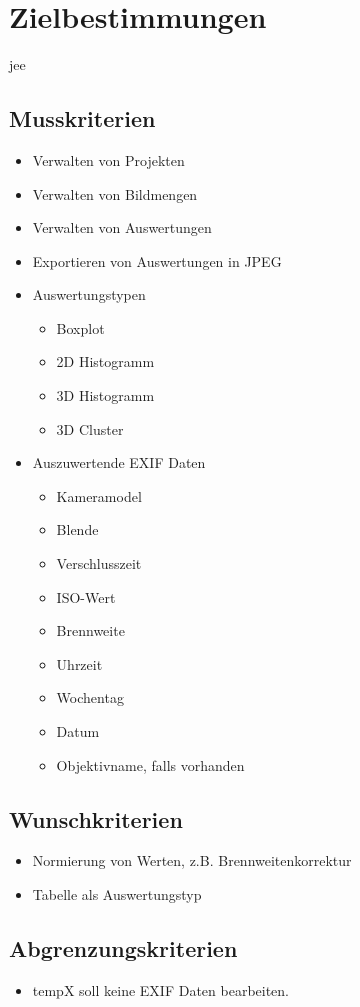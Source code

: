 \section{Zielbestimmungen}

\gls{jee}

\subsection{Musskriterien} 
\begin{itemize}
	\item Verwalten von Projekten
	\item Verwalten von Bildmengen
	\item Verwalten von Auswertungen
	\item Exportieren von Auswertungen in JPEG
	\item Auswertungstypen
		\begin{itemize}
			\item Boxplot
			\item 2D Histogramm 
			\item 3D Histogramm 
			\item 3D Cluster
		\end{itemize}
	\item Auszuwertende EXIF Daten
			\begin{itemize}
			\item Kameramodel
			\item Blende 
			\item Verschlusszeit
			\item ISO-Wert
			\item Brennweite
			\item Uhrzeit
			\item Wochentag
			\item Datum
			\item Objektivname, falls vorhanden
		\end{itemize}
	
\end{itemize}

\subsection{Wunschkriterien} 
\begin{itemize}
	\item Normierung von Werten, z.B. Brennweitenkorrektur
	\item Tabelle als Auswertungstyp
\end{itemize}

\subsection{Abgrenzungskriterien} 
\begin{itemize}
	\item \gls{tempX} soll keine EXIF Daten bearbeiten.
\end{itemize}
